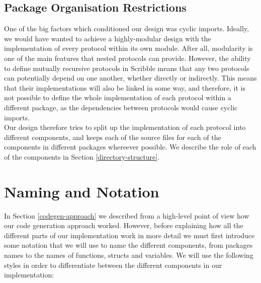 \documentclass[12pt,twoside]{report}
\begin{document}
\subsection{Package Organisation Restrictions}\label{package-organisation-restrictions}

One of the big factors which conditioned our design was cyclic imports. Ideally, we would have wanted to achieve a highly-modular design with the implementation of every protocol within its own module. After all, modularity is one of the main features that nested protocols can provide. However, the ability to define mutually recursive protocols in Scribble means that any two protocols can potentially depend on one another, whether directly or indirectly. This means that their implementations will also be linked in some way, and therefore, it is not possible to define the whole implementation of each protocol within a different package, as the dependencies between protocols would cause cyclic imports.\\

Our design therefore tries to split up the implementation of each protocol into different components, and keeps each of the source files for each of the components in different packages whereever possible. We describe the role of each of the components in Section \ref{directory-structure}.






\section{Naming and Notation}\label{naming-and-notation}
In Section \ref{codegen-approach} we described from a high-level point of view how our code generation approach worked. However, before explaining how all the different parts of our implementation work in more detail we must first introduce some notation that we will use to name the different components, from packages names to the names of functions, structs and variables. We will use the following styles in order to differentiate between the different components in our implementation:
\end{document}
